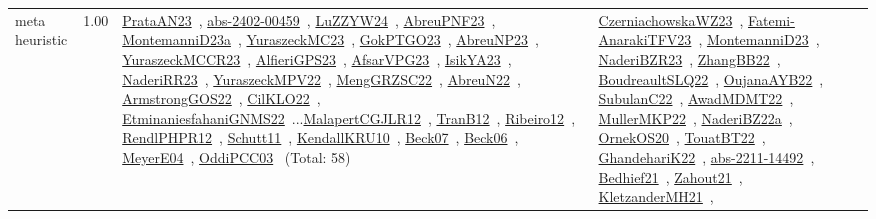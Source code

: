 {\begin{longtable}{p{3cm}r>{\raggedright\arraybackslash}p{6cm}>{\raggedright\arraybackslash}p{6cm}>{\raggedright\arraybackslash}p{8cm}}
\index{meta heuristic}\index{Algorithms!meta heuristic}meta heuristic &  1.00 & \href{../works/PrataAN23.pdf}{PrataAN23}~\cite{PrataAN23}, \href{../works/abs-2402-00459.pdf}{abs-2402-00459}~\cite{abs-2402-00459}, \href{../works/LuZZYW24.pdf}{LuZZYW24}~\cite{LuZZYW24}, \href{../works/AbreuPNF23.pdf}{AbreuPNF23}~\cite{AbreuPNF23}, \href{../works/MontemanniD23a.pdf}{MontemanniD23a}~\cite{MontemanniD23a}, \href{../works/YuraszeckMC23.pdf}{YuraszeckMC23}~\cite{YuraszeckMC23}, \href{../works/GokPTGO23.pdf}{GokPTGO23}~\cite{GokPTGO23}, \href{../works/AbreuNP23.pdf}{AbreuNP23}~\cite{AbreuNP23}, \href{../works/YuraszeckMCCR23.pdf}{YuraszeckMCCR23}~\cite{YuraszeckMCCR23}, \href{../works/AlfieriGPS23.pdf}{AlfieriGPS23}~\cite{AlfieriGPS23}, \href{../works/AfsarVPG23.pdf}{AfsarVPG23}~\cite{AfsarVPG23}, \href{../works/IsikYA23.pdf}{IsikYA23}~\cite{IsikYA23}, \href{../works/NaderiRR23.pdf}{NaderiRR23}~\cite{NaderiRR23}, \href{../works/YuraszeckMPV22.pdf}{YuraszeckMPV22}~\cite{YuraszeckMPV22}, \href{../works/MengGRZSC22.pdf}{MengGRZSC22}~\cite{MengGRZSC22}, \href{../works/AbreuN22.pdf}{AbreuN22}~\cite{AbreuN22}, \href{../works/ArmstrongGOS22.pdf}{ArmstrongGOS22}~\cite{ArmstrongGOS22}, \href{../works/CilKLO22.pdf}{CilKLO22}~\cite{CilKLO22}, \href{../works/EtminaniesfahaniGNMS22.pdf}{EtminaniesfahaniGNMS22}~\cite{EtminaniesfahaniGNMS22}...\href{../works/MalapertCGJLR12.pdf}{MalapertCGJLR12}~\cite{MalapertCGJLR12}, \href{../works/TranB12.pdf}{TranB12}~\cite{TranB12}, \href{../works/Ribeiro12.pdf}{Ribeiro12}~\cite{Ribeiro12}, \href{../works/RendlPHPR12.pdf}{RendlPHPR12}~\cite{RendlPHPR12}, \href{../works/Schutt11.pdf}{Schutt11}~\cite{Schutt11}, \href{../works/KendallKRU10.pdf}{KendallKRU10}~\cite{KendallKRU10}, \href{../works/Beck07.pdf}{Beck07}~\cite{Beck07}, \href{../works/Beck06.pdf}{Beck06}~\cite{Beck06}, \href{../works/MeyerE04.pdf}{MeyerE04}~\cite{MeyerE04}, \href{../works/OddiPCC03.pdf}{OddiPCC03}~\cite{OddiPCC03} (Total: 58) & \href{../works/CzerniachowskaWZ23.pdf}{CzerniachowskaWZ23}~\cite{CzerniachowskaWZ23}, \href{../works/Fatemi-AnarakiTFV23.pdf}{Fatemi-AnarakiTFV23}~\cite{Fatemi-AnarakiTFV23}, \href{../works/MontemanniD23.pdf}{MontemanniD23}~\cite{MontemanniD23}, \href{../works/NaderiBZR23.pdf}{NaderiBZR23}~\cite{NaderiBZR23}, \href{../works/ZhangBB22.pdf}{ZhangBB22}~\cite{ZhangBB22}, \href{../works/BoudreaultSLQ22.pdf}{BoudreaultSLQ22}~\cite{BoudreaultSLQ22}, \href{../works/OujanaAYB22.pdf}{OujanaAYB22}~\cite{OujanaAYB22}, \href{../works/SubulanC22.pdf}{SubulanC22}~\cite{SubulanC22}, \href{../works/AwadMDMT22.pdf}{AwadMDMT22}~\cite{AwadMDMT22}, \href{../works/MullerMKP22.pdf}{MullerMKP22}~\cite{MullerMKP22}, \href{../works/NaderiBZ22a.pdf}{NaderiBZ22a}~\cite{NaderiBZ22a}, \href{../works/OrnekOS20.pdf}{OrnekOS20}~\cite{OrnekOS20}, \href{../works/TouatBT22.pdf}{TouatBT22}~\cite{TouatBT22}, \href{../works/GhandehariK22.pdf}{GhandehariK22}~\cite{GhandehariK22}, \href{../works/abs-2211-14492.pdf}{abs-2211-14492}~\cite{abs-2211-14492}, \href{../works/Bedhief21.pdf}{Bedhief21}~\cite{Bedhief21}, \href{../works/Zahout21.pdf}{Zahout21}~\cite{Zahout21}, \href{../works/KletzanderMH21.pdf}{KletzanderMH21}~\cite{KletzanderMH21}, 
\end{longtable}}
